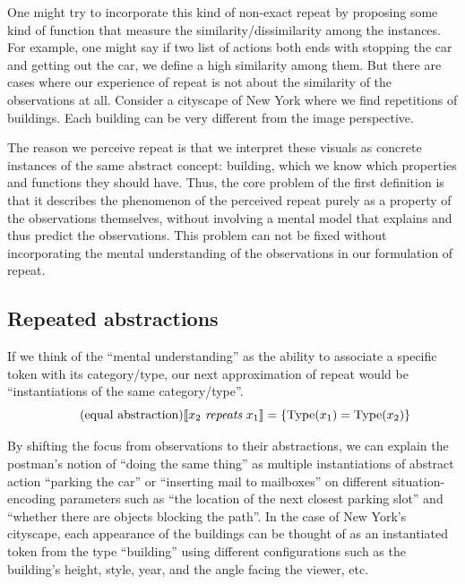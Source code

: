 One might try to incorporate this kind of non-exact repeat by proposing some kind of function that measure the similarity/dissimilarity among the instances. For example, one might say if two list of actions both ends with stopping the car and getting out the car, we define a high similarity among them. But there are cases where our experience of repeat is not about the similarity of the observations at all. Consider a cityscape of New York where we find repetitions of buildings. Each building can be very different from the image perspective. 

The reason we perceive repeat is that we interpret these visuals as concrete instances of the same abstract concept: building, which we know which properties and functions they should have. Thus, the core problem of the first definition is that it describes the phenomenon of the perceived repeat purely as a property of the observations themselves, without involving a mental model that explains and thus predict the observations. This problem can not be fixed without incorporating the mental understanding of the observations in our formulation of repeat.  

\subsection{Repeated abstractions}

If we think of the ``mental understanding'' as the ability to associate a specific token with its category/type, our next approximation of repeat would be ``instantiations of the same category/type''. 
\begin{equation} 
    \tag{equal abstraction}
    \llbracket x_2 \ \emph{repeats}\  x_1  \rrbracket = \left\{ \text{Type}(x_1) = \text{Type}(x_2)\right\}
\end{equation}

By shifting the focus from observations to their abstractions, we can explain the postman's notion of ``doing the same thing'' as multiple instantiations of abstract action ``parking the car'' or ``inserting mail to mailboxes'' on different situation-encoding parameters such as ``the location of the next closest parking slot'' and ``whether there are objects blocking the path''. In the case of New York's cityscape, each appearance of the buildings can be thought of as an instantiated token from the type ``building'' using different configurations such as the building's height, style, year, and the angle facing the viewer, etc. 

